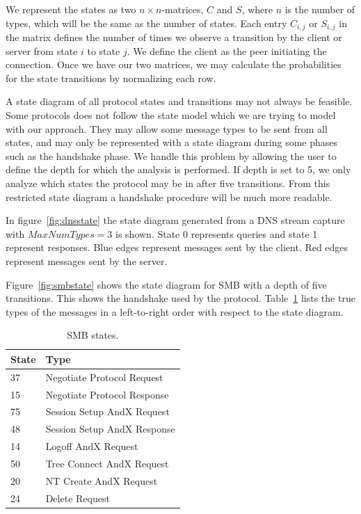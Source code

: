 \documentclass[a4paper]{report}
\begin{document}
We represent the states as two $n \times n$-matrices, $C$ and  $S$, where 
$n$ is the number of types, which will be the same as the number of states.
Each entry $C_{i,j}$ or $S_{i,j}$ in the matrix defines the number of times
we observe a transition by the client or server from state $i$ to state $j$.
We define the client as the peer initiating the connection. Once we have our
two matrices, we may calculate the probabilities for the state transitions by
normalizing each row.

A state diagram of all protocol states and transitions may not always be
feasible. Some protocols does not follow the state model which we are
trying to model with our approach. They may allow some message types to
be sent from all states, and may only be represented with a state diagram
during some phases such as the handshake phase. We handle this problem by
allowing the user to define the depth for which the analysis is performed.
If depth is set to 5, we only analyze which states the protocol may be in
after five transitions. From this restricted state diagram a handshake
procedure will be much more readable.


In figure~\ref{fig:dnsstate} the state diagram generated from a DNS stream
capture with $MaxNumTypes = 3$ is shown. State 0 represents queries and state 1
represent responses. Blue edges represent messages sent by the client. Red
edges represent messages sent by the server.

Figure~\ref{fig:smbstate} shows the state diagram for SMB with a depth of
five transitions. This shows the handshake used by the protocol.
Table~\ref{tab:smb} lists the true types of the messages in a left-to-right
order with respect to the state diagram.

\begin{table}
    \centering
    \captionsetup{width=0.8\textwidth}
    \caption{SMB states.}
    \begin{tabular}{ | l | l |}
        \hline
        \textbf{State}&\textbf{Type}\\ \hline
        37          & Negotiate Protocol Request    \\ \hline
        15          & Negotiate Protocol Response   \\ \hline
        75          & Session Setup AndX Request    \\ \hline
        48          & Session Setup AndX Response   \\ \hline
        14          & Logoff AndX Request           \\ \hline
        50          & Tree Connect AndX Request     \\ \hline
        20          & NT Create AndX Request        \\ \hline
        24          & Delete Request                \\ \hline
    \end{tabular}
    \label{tab:smb}
\end{table}
\end{document}
